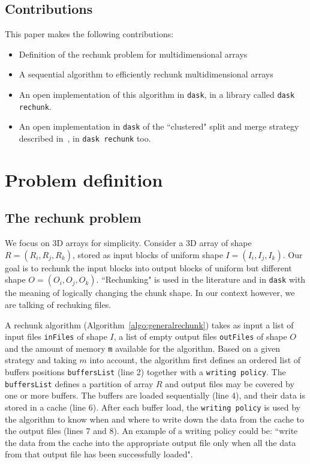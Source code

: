 \documentclass[conference]{IEEEtran}
\begin{document}
\subsection{Contributions}
This paper makes the following contributions:
\begin{itemize}
  \item Definition of the rechunk problem for multidimensional arrays
  \item A sequential algorithm to efficiently rechunk multidimensional arrays
  \item An open implementation of this algorithm in \texttt{dask},
  in a library called \texttt{dask rechunk}.
  \item An open implementation in \texttt{dask} of the ``clustered" split and
  merge strategy described in~\cite{seqalgorithms}, in \texttt{dask rechunk} too.
\end{itemize}

\section{Problem definition}
\subsection{The rechunk problem}
We focus on 3D arrays for simplicity. Consider a 3D array of shape $R =
(R_i, R_j, R_k)$, stored as input blocks of uniform shape $I =
(I_i, I_j, I_k)$. Our goal is to rechunk the input blocks into output blocks of
uniform but different shape $O = (O_i, O_j, O_k)$. ``Rechunking" is used in
the literature and in \texttt{dask} with the meaning of logically changing the
chunk shape. In our context however, we are talking of rechuking files.

A rechunk algorithm (Algorithm~\ref{algo:generalrechunk}) takes as input a
list of input files \texttt{inFiles} of shape $I$, a list of empty output files
\texttt{outFiles} of shape $O$ and the amount of memory \texttt{m}
available for the algorithm. Based on a given strategy and taking $m$ into
account, the algorithm first defines an ordered list of buffers positions
\texttt{buffersList} (line 2) together with a \texttt{writing policy}. The
\texttt{buffersList} defines a partition of array $R$ and output files
may be covered by one or more buffers. The buffers are loaded sequentially
(line 4), and their data is stored in a cache (line 6). After each buffer load,
the \texttt{writing policy} is used by the algorithm to know when and where to
write down the data from the cache to the output files (lines 7 and 8). An
example of a writing policy could be:
``write the data from the cache into the appropriate output file only when all
the data from that output file has been successfully loaded".
\end{document}
